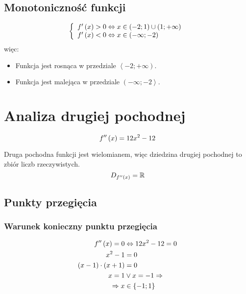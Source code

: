 \documentclass[a4paper,12pt]{article}
\newcommand{\podx}{
		\ensuremath f' \left( x \right)
	}
\newcommand{\dodx}{
		\ensuremath f'' \left( x \right)
	}
\begin{document}
\subsection{Monotoniczność funkcji}

\[ \left\{
	\begin{array}{l}
		\podx > 0 \Leftrightarrow x \in \left( -2; 1 \right) \cup \left( 1; + \infty \right) \\
		\podx < 0 \Leftrightarrow x \in \left( - \infty; -2 \right)
	\end{array}
\right. \]
więc:
\begin{itemize}
	\item Funkcja jest rosnąca w przedziale $\left\langle -2; +\infty \right)$.
\item Funkcja jest malejąca w przedziale $\left( -\infty ; -2 \right\rangle$.
\end{itemize}

\section{Analiza drugiej pochodnej}

\[ \dodx = 12x^2 - 12\]

Druga pochodna funkcji jest wielomianem, więc dziedzina drugiej pochodnej to zbiór liczb rzeczywistych.
\[ D_{\dodx} = \mathbb{R} \]

\subsection{Punkty przegięcia}

\subsubsection*{Warunek konieczny punktu przegięcia}

\begin{align*}
	\dodx = 0 &\Leftrightarrow 12x^2 - 12 = 0\\
	x^2 -1 &= 0 \\
	\left( x - 1 \right) \cdot \left( x + 1 \right) &= 0\\
	x = 1 &\vee x = - 1 \Rightarrow \\
	\Rightarrow x &\in \left\{ -1; 1 \right\}
\end{align*}

\begin{figure}[h]
	\centering
\end{figure}
\end{document}
